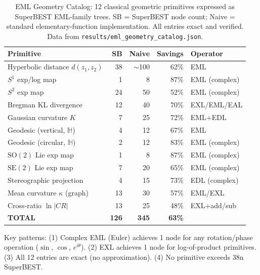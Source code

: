\begin{table}[h]
\centering
\small
\begin{tabular}{lrrrl}
\toprule
\textbf{Primitive} & \textbf{SB} & \textbf{Naive} & \textbf{Savings} & \textbf{Operator} \\
\midrule
Hyperbolic distance $d(z_1,z_2)$ & 38 & $\sim$100 & 62\% & EML \\
$S^1$ exp/log map                & 1  & 8          & 87\% & EML (complex) \\
$S^2$ exp map                    & 24 & 50         & 52\% & EML (complex) \\
Bregman KL divergence            & 12 & 40         & 70\% & EXL/EML/EAL \\
Gaussian curvature $K$           & 7  & 25         & 72\% & EML+EDL \\
Geodesic (vertical, $\mathbb{H}$)& 4  & 12         & 67\% & EML \\
Geodesic (circular, $\mathbb{H}$)& 2  & 12         & 83\% & EML (complex) \\
$\mathrm{SO}(2)$ Lie exp map     & 1  & 8          & 87\% & EML (complex) \\
$\mathrm{SE}(2)$ Lie exp map     & 7  & 20         & 65\% & EML (complex) \\
Stereographic projection         & 4  & 15         & 73\% & EDL (complex) \\
Mean curvature $\kappa$ (graph)  & 13 & 30         & 57\% & EML/EXL \\
Cross-ratio $\ln|CR|$            & 13 & 25         & 48\% & EXL+add/sub \\
\midrule
\textbf{TOTAL}                   & \textbf{126} & \textbf{345} & \textbf{63\%} & \\
\bottomrule
\end{tabular}
\caption{EML Geometry Catalog: 12 classical geometric primitives expressed as
SuperBEST EML-family trees. SB = SuperBEST node count; Naive = standard
elementary-function implementation. All entries exact and verified.
Data from \texttt{results/eml\_geometry\_catalog.json}.}
\label{tab:geometry}
\end{table}

Key patterns: (1) Complex EML (Euler) achieves 1 node for any rotation/phase operation
($\sin$, $\cos$, $e^{i\theta}$). (2) EXL achieves 1 node for log-of-product primitives.
(3) All 12 entries are exact (no approximation). (4) No primitive exceeds 38n SuperBEST.
